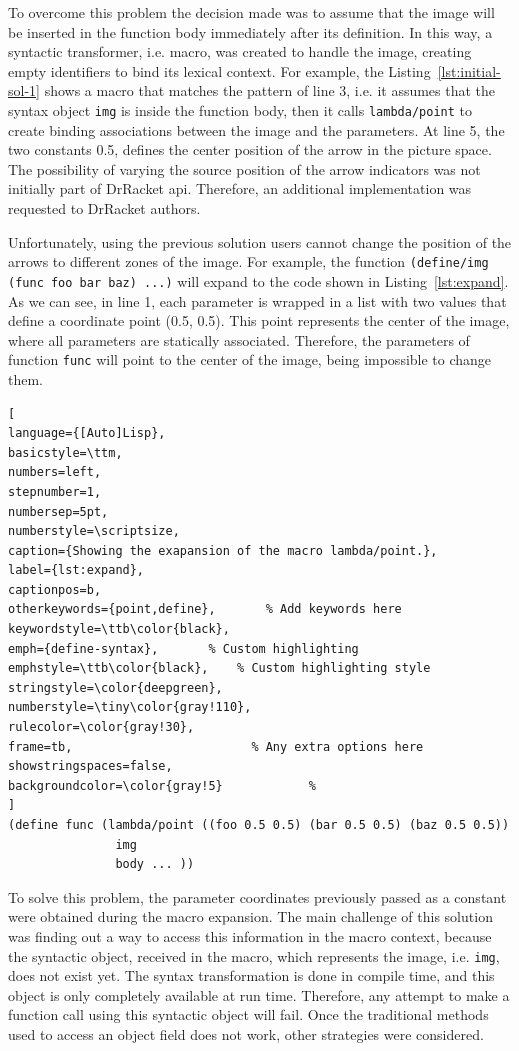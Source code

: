 To overcome this problem the decision made was to assume that the image will be inserted in the function body immediately after its definition. In this way, a syntactic transformer, i.e. macro, was created to handle the image, creating empty identifiers to bind its lexical context. For example, the Listing~\ref{lst:initial-sol-1} shows a macro that matches the pattern of line 3, i.e. it assumes that the syntax object \texttt{img} is inside the function body, then it calls \texttt{lambda/point} to create binding associations between the image and the parameters. At line 5, the two constants 0.5, defines the center position of the arrow in the picture space. The possibility of varying the source position of the arrow indicators was not initially part of DrRacket \gls{api}. Therefore, an additional implementation was requested to DrRacket authors.

Unfortunately, using the previous solution users cannot change the position of the arrows to different zones of the image. For example, the function \texttt{(define/img (func foo bar baz) ...)} will expand to the code shown in Listing~\ref{lst:expand}. As we can see, in line 1, each parameter is wrapped in a list with two values that define a coordinate point (0.5, 0.5). This point represents the center of the image, where all parameters are statically associated. Therefore, the parameters of function \texttt{func} will point to the center of the image, being impossible to change them. \\

\begin{lstlisting}[
language={[Auto]Lisp},
basicstyle=\ttm,
numbers=left,
stepnumber=1,
numbersep=5pt,                   
numberstyle=\scriptsize, 
caption={Showing the exapansion of the macro lambda/point.},
label={lst:expand},
captionpos=b, 
otherkeywords={point,define},       % Add keywords here
keywordstyle=\ttb\color{black},
emph={define-syntax},       % Custom highlighting
emphstyle=\ttb\color{black},    % Custom highlighting style
stringstyle=\color{deepgreen},
numberstyle=\tiny\color{gray!110},
rulecolor=\color{gray!30},
frame=tb,                         % Any extra options here
showstringspaces=false,
backgroundcolor=\color{gray!5}            % 
]
(define func (lambda/point ((foo 0.5 0.5) (bar 0.5 0.5) (baz 0.5 0.5)) 
               img 
               body ... ))
\end{lstlisting}

To solve this problem, the parameter coordinates previously passed as a constant were obtained during the macro expansion. The main challenge of this solution was finding out a way to access this information in the macro context, because the syntactic object,  received in the macro, which represents the image, i.e. \texttt{img}, does not exist yet. The syntax transformation is done in compile time, and this object is only completely available at run time. Therefore, any attempt to make a function call using this syntactic object will fail. Once the traditional methods used to access an object field does not work, other strategies were considered. 

